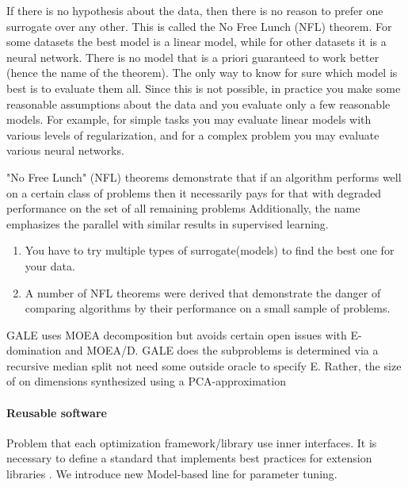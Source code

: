         If there is no hypothesis about the data, then there is no reason to prefer one surrogate over any other. This is called the No Free Lunch (NFL) theorem. For some datasets the best
        model is a linear model, while for other datasets it is a neural network. There is no model that is a priori guaranteed to work better (hence the name of the theorem). 
        The only way to know for sure which model is best is to evaluate them all. Since this is not possible, in practice you make some reasonable assumptions about the data 
        and you evaluate only a few reasonable models. For example, for simple tasks you may evaluate linear models with various levels of regularization, 
        and for a complex problem you may evaluate various neural networks.

        "No Free Lunch" (NFL) theorems demonstrate that if an algorithm performs well on a certain class of problems then it necessarily pays for that with degraded performance on the set of 
        all remaining problems Additionally, the name emphasizes the parallel with similar results in supervised learning.
        \begin{enumerate}
            \item You have to try multiple types of surrogate(models) to find the best one for your data.
            \item A number of NFL theorems were derived that demonstrate the danger of comparing algorithms by their performance on a small sample of problems.
        \end{enumerate}

        GALE uses MOEA decomposition but avoids certain open issues with E-domination and MOEA/D. 
        GALE does the subproblems is determined via a recursive median split not need some outside oracle to specify E. 
        Rather, the size of on dimensions synthesized using a PCA-approximation

        \paragraph{Reusable software}
        Problem that each optimization framework/library use inner interfaces. 
        It is necessary to define a standard that implements best practices for extension libraries \cite{buitinck2013api}.
        We introduce new Model-based line for parameter tuning. 


